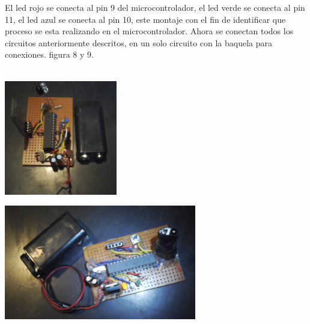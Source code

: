 \documentclass[12pt]{article}
\newenvironment{Figure}
{\par\medskip\noindent\minipage{\linewidth}}
{\endminipage\par\medskip}
\begin{document}
\begin{multicols}{2}
El led rojo se conecta al pin  9 del microcontrolador, el led verde se conecta al pin 11, el led azul se conecta al pin 10, este montaje con el fin de identificar que proceso se esta realizando en el microcontrolador. Ahora se conectan todos los circuitos anteriormente descritos, en un solo circuito con la baquela para conexiones. figura 8 y 9.  
\\ \\
\begin{Figure}
\center
\includegraphics[width=7.cm, height=5cm]{fig/mon0.png}
\label{fig:g8}
\end{Figure}
\vspace{0.2cm}

\begin{Figure}
\center
\includegraphics[width=7.cm, height=5cm]{fig/mon1.png}
\label{fig:g9}
\end{Figure}
\vspace{0.2cm}


\end{multicols}
\end{document}
